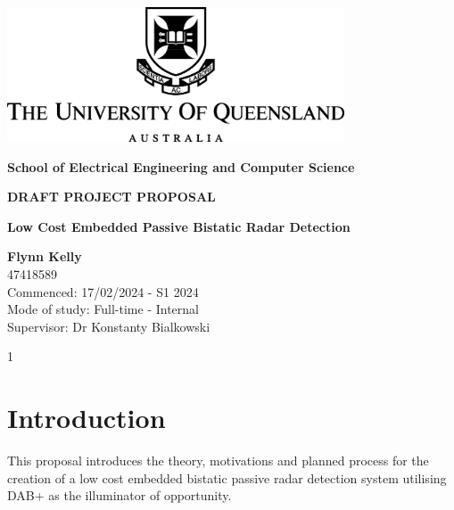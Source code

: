 \documentclass[12pt,a4paper]{article}
\begin{document}
\begin{titlepage}
    \begin{center}
        \vspace*{1cm}

        \includegraphics[width=0.75\textwidth]{UQLogo.jpg}
        
        \vspace{1.5cm}
        
        \textbf{\Large{School of Electrical Engineering and Computer Science}}
        
        \vspace{2.5cm}
        
        \textbf{\Large{DRAFT PROJECT PROPOSAL}}
        
        \vspace{0.5cm}

        \textbf{\Large{Low Cost Embedded Passive Bistatic Radar Detection}}
        
        \vspace{2cm}
        
        \textbf{Flynn Kelly}\\
        47418589\\
        
        Commenced: 17/02/2024 - S1 2024\\
        Mode of study: Full-time - Internal\\
        Supervisor: Dr Konstanty Bialkowski
        
        \vfill
        
        \vspace{0.8cm}
        
        \Large{1}
        
    \end{center}
\end{titlepage}

\tableofcontents
\clearpage


\section{Introduction}
This proposal introduces the theory, motivations and planned process for the creation of a low cost embedded bistatic passive radar detection system utilising DAB+ as the illuminator of opportunity. 
\end{document}

